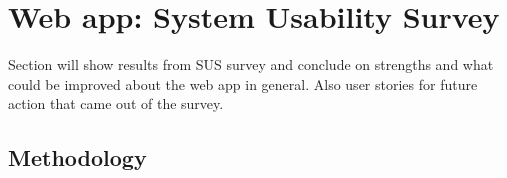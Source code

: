 \section{Web app: System Usability Survey}

Section will show results from SUS survey and conclude on strengths and what
could be improved about the web app in general. Also user stories for future
action that came out of the survey.

\subsection{Methodology}
